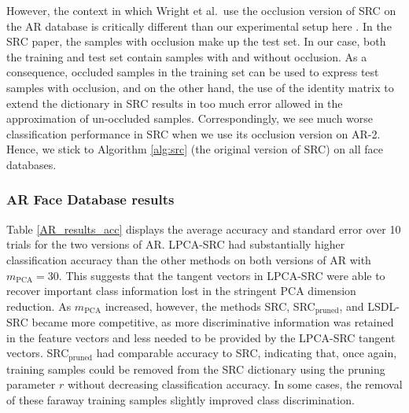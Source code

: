 \documentclass[review]{elsarticle}
\begin{document}
However, the context in which Wright et al.\ use the occlusion version of SRC on the AR database is critically different than our experimental setup here \cite{wri:src}. In the SRC paper, the samples with occlusion make up the test set. In our case, both the training and test set contain samples with and without occlusion. As a consequence, occluded samples in the training set can be used to express test samples with occlusion, and on the other hand, the use of the identity matrix to extend the dictionary in SRC results in too much error allowed in the approximation of un-occluded samples. Correspondingly, we see much worse classification performance in SRC when we use its occlusion version on AR-2. Hence, we stick to Algorithm \ref{alg:src} (the original version of SRC) on all face databases.






\subsubsection{AR Face Database results} \label{sec:AR}

Table \ref{AR_results_acc} displays the average accuracy and standard error over 10 trials for the two versions of AR. LPCA-SRC had substantially higher classification accuracy than the other methods on both versions of AR with $m_\mathrm{PCA} = 30$. This suggests that the tangent vectors in LPCA-SRC were able to recover important class information lost in the stringent PCA dimension reduction. As $m_\mathrm{PCA}$ increased, however, the methods SRC, SRC$_\mathrm{pruned}$, and LSDL-SRC became more competitive, as more discriminative information was retained in the feature vectors and less needed to be provided by the LPCA-SRC tangent vectors. SRC$_\mathrm{pruned}$ had comparable accuracy to SRC, indicating that, once again, training samples could be removed from the SRC dictionary using the pruning parameter $r$ without decreasing classification accuracy. In some cases, the removal of these faraway training samples slightly improved class discrimination.
\end{document}
